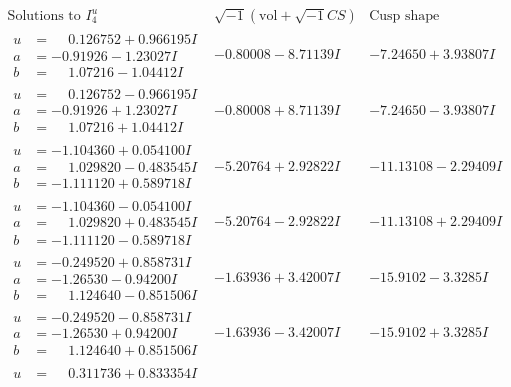 \documentclass[1p]{elsarticle_modified}
\theoremstyle{definition}
\newcommand{\I}{\sqrt{-1}}
\begin{document}
$$\begin{array}{c|c|c}  
\text{Solutions to }I^u_{4}& \I (\text{vol} + \sqrt{-1}CS) & \text{Cusp shape}\\
 \hline 
\begin{aligned}
u &= \phantom{-}0.126752 + 0.966195 I \\
a &= -0.91926 - 1.23027 I \\
b &= \phantom{-}1.07216 - 1.04412 I\end{aligned}
 & -0.80008 - 8.71139 I & -7.24650 + 3.93807 I \\ \hline\begin{aligned}
u &= \phantom{-}0.126752 - 0.966195 I \\
a &= -0.91926 + 1.23027 I \\
b &= \phantom{-}1.07216 + 1.04412 I\end{aligned}
 & -0.80008 + 8.71139 I & -7.24650 - 3.93807 I \\ \hline\begin{aligned}
u &= -1.104360 + 0.054100 I \\
a &= \phantom{-}1.029820 - 0.483545 I \\
b &= -1.111120 + 0.589718 I\end{aligned}
 & -5.20764 + 2.92822 I & -11.13108 - 2.29409 I \\ \hline\begin{aligned}
u &= -1.104360 - 0.054100 I \\
a &= \phantom{-}1.029820 + 0.483545 I \\
b &= -1.111120 - 0.589718 I\end{aligned}
 & -5.20764 - 2.92822 I & -11.13108 + 2.29409 I \\ \hline\begin{aligned}
u &= -0.249520 + 0.858731 I \\
a &= -1.26530 - 0.94200 I \\
b &= \phantom{-}1.124640 - 0.851506 I\end{aligned}
 & -1.63936 + 3.42007 I & -15.9102 - 3.3285 I \\ \hline\begin{aligned}
u &= -0.249520 - 0.858731 I \\
a &= -1.26530 + 0.94200 I \\
b &= \phantom{-}1.124640 + 0.851506 I\end{aligned}
 & -1.63936 - 3.42007 I & -15.9102 + 3.3285 I \\ \hline\begin{aligned}
u &= \phantom{-}0.311736 + 0.833354 I \\

\end{aligned}
\end{array}$$
\end{document}
